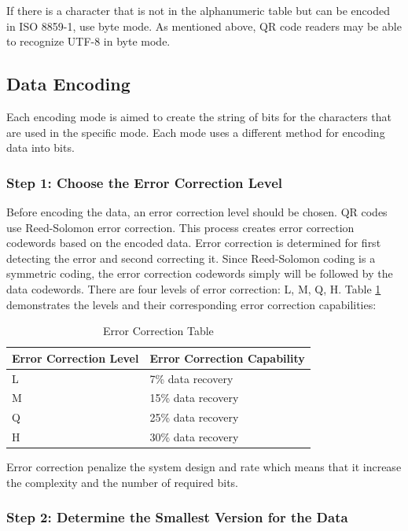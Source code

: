 If there is a character that is not in the alphanumeric table but can be encoded in ISO 8859-1, use byte mode. As mentioned above, QR code readers may be able to recognize UTF-8 in byte mode.\\


\subsection{Data Encoding}
Each encoding mode is aimed to create the string of bits for the characters that are used in the specific mode. Each mode uses a different method for encoding data into bits.

\subsubsection*{Step 1: Choose the Error Correction Level} 

Before encoding the data, an error correction level should be chosen. QR codes use Reed-Solomon error correction. This process creates error correction codewords based on the encoded data. Error correction is determined for first detecting the error and second correcting it. Since Reed-Solomon coding is a symmetric coding, the error correction codewords simply will be followed by the data codewords. There are four levels of error correction: L, M, Q, H. Table \ref{table2.1} demonstrates the levels and their corresponding error correction capabilities:

\begin{table}[h!]
  \centering
          \caption{Error Correction Table}
         \label{table2.1}
    \begin{tabular}{| l | l |}
    \hline
    Error Correction Level & Error Correction Capability \\ \hline
    L & 7\% data recovery  \\ \hline
    M & 15\% data recovery  \\ \hline
    Q & 25\% data recovery \\ \hline
    H & 30\% data recovery \\ \hline
    \end{tabular}

\end{table}

Error correction penalize the system design and rate which means that it increase the complexity and the number of required bits.

\subsubsection*{Step 2: Determine the Smallest Version for the Data}

